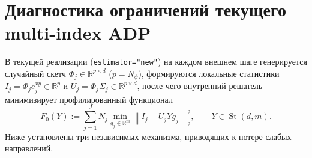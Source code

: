\documentclass[11pt,a4paper]{article}
\numberwithin{equation}{section}
\theoremstyle{definition}
\theoremstyle{remark}
\newcommand{\R}{\mathbb{R}}
\newcommand{\St}{\operatorname{St}}
\newcommand{\norm}[1]{\left\lVert #1 \right\rVert}
\newcommand{\code}[1]{\nolinkurl{#1}}
\begin{document}
\section{Диагностика ограничений текущего multi-index ADP}
\label{sec:diagnosis}

В текущей реализации (\code{estimator="new"}) на каждом внешнем шаге генерируется
случайный скетч $\Phi_j \in \R^{p \times d}$ ($p = N_\phi$), формируются локальные
статистики $I_j = \Phi_j c_j^{xy} \in \R^p$ и $U_j = \Phi_j \Sigma_j \in \R^{p \times d}$,
после чего внутренний решатель минимизирует профилированный функционал
\begin{equation}\label{eq:F0}
  F_0(Y) := \sum_{j=1}^J N_j \min_{g_j \in \R^m} \norm{I_j - U_j Y g_j}_2^2,
  \qquad Y \in \St(d,m).
\end{equation}
Ниже установлены три независимых механизма, приводящих к потере слабых направлений.
\end{document}
